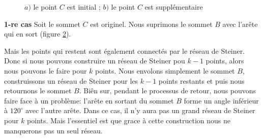\documentclass[10pt,a4paper]{article}%
\theoremstyle{theorem}
\theoremstyle{definition}
\begin{document}
\begin{figure}[h]
\begin{center}
\begin{tikzpicture}
	        		
	        		\end{tikzpicture}
	        	\end{center}
        		\caption{$a)$ le point $C$ est initial ; $b)$ le point $C$ est supplémentaire}\label{point}
	        	\end{figure}
        	
	        	\textbf{1-re cas} Soit le sommet $C$ est originel. Nous suprimons le sommet $B$ avec l'arête qui en sort (figure \ref{reseau1}). 
	        	\begin{figure}[h]
	        		\begin{center}
	        	\end{center}
	        	\caption{}\label{reseau1}
	        	\end{figure}
        		
        		Mais les points qui restent sont également connectés par le réseau de Steiner. Donc si nous pouvons construire un réseau de Steiner pou $k-1$ points, alors nous pouvons le faire pour $k$ points.  Nous envolons simplement le sommet $B$, construissons un réseau de Steiner pour les $k-1$ points restants et puis nous retournons le sommet $B$. Biên sur, pendant le processus de retour, nous pouvons faire face à un problème: l'arête en sortant du sommet $B$ forme un angle inférieur à $120^\circ$ avec l'autre arête. Dans ce cas, il n'y aura pas un grand réseau de Steiner pour $k$ points. Mais l'essentiel est que grace à cette construction nous ne manquerons pas un seul réseau. 
        		
\end{document}
